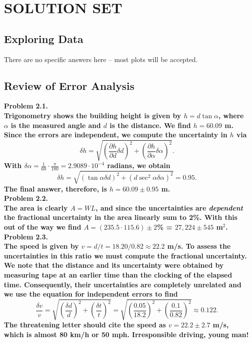 \chapter{SOLUTION SET}
\label{ch:solutions}

\section{Exploring Data}

There are no specific answers here -- most plots will be accepted.

\section{Review of Error Analysis}

\noindent
\bf{Problem 2.1.} \\

Trigonometry shows the building height is given by $h = d \tan \alpha$, where $\alpha$ is the
measured angle and $d$ is the distance.  We find $h = 60.09$ m.  Since the errors are independent, we compute
the uncertainty in $h$ via
$$
\delta h = \sqrt{\left( \frac{\partial h}{\partial d} \delta d \right)^2 + \left(\frac{\partial h}{\partial \alpha }\delta \alpha \right)^2}.
$$
With $\delta \alpha = \frac{1}{60}\cdot\frac{\pi}{180} = 2.9089\cdot 10^{-4}$ radians, we obtain
$$
\delta h = \sqrt{\left( \tan \alpha \delta d \right)^2 + \left(d \sec^2 \alpha \delta \alpha \right)^2} = 0.95.
$$
The final answer, therefore, is $h = 60.09 \pm 0.95$ m.
\\

\noindent
\bf{Problem 2.2.} \\

The area is clearly $A = WL$, and since the uncertainties are \emph{dependent} the fractional uncertainty in the area linearly
sum to 2\%.  With this out of the way we find $A = (235.5\cdot115.6) \pm 2$\% = $27,224 \pm 545$ m$^2$.
\\

\noindent
\bf{Problem 2.3.} \\

The speed is given by $v = d/t = 18.20 /0.82 \approx 22.2$  m/s.
To assess the uncertainties in this ratio we must compute the fractional uncertainty.  We note that
the distance and its uncertainty were obtained by measuring tape at an earlier time than the
clocking of the elapsed time. Consequently, their uncertainties are completely unrelated and we use the equation for
independent errors to find
$$
\frac{\delta v}{v} = \sqrt{\left (\frac{\delta d}{d}\right )^2 + \left (\frac{\delta t}{t}\right )^2} = \sqrt{\left (\frac{0.05}{18.2}\right )^2 + \left (\frac{0.1}{0.82}\right )^2} \approx 0.122.
$$
The threatening letter should cite the speed as $v = 22.2 \pm 2.7$ m/s, which is almost 80 km/h or 50 mph.  Irresponsible driving, young man!
\\

